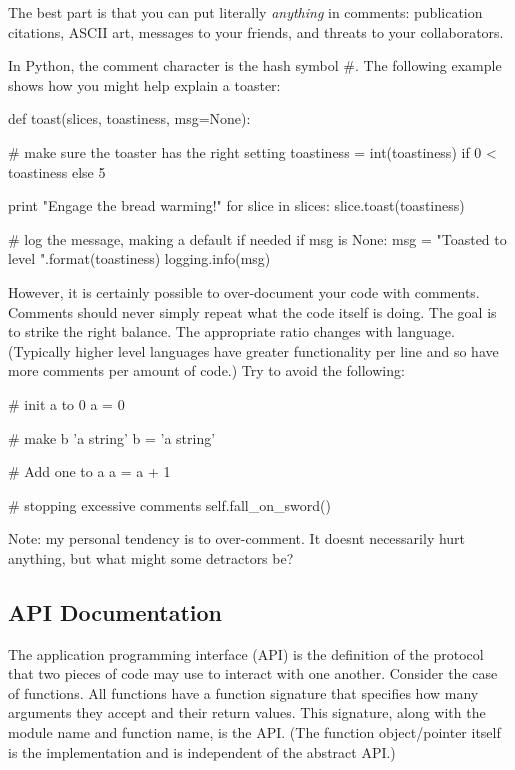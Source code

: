 The best part is that you can put literally {\itshape anything} in comments\+: publication citations, A\+S\+C\+II art, messages to your friends, and threats to your collaborators.

In Python, the comment character is the hash symbol {\ttfamily \#}. The following example shows how you might help explain a toaster\+:

\begin{DoxyVerb}def toast(slices, toastiness, msg=None):

    # make sure the toaster has the right setting
    toastiness = int(toastiness) if 0 < toastiness else 5

    print "Engage the bread warming!"
    for slice in slices:
        slice.toast(toastiness)

    # log the message, making a default if needed
    if msg is None:
        msg = "Toasted to level {}".format(toastiness)
    logging.info(msg)
\end{DoxyVerb}


However, it is certainly possible to over-\/document your code with comments. Comments should never simply repeat what the code itself is doing. The goal is to strike the right balance. The appropriate ratio changes with language. (Typically higher level languages have greater functionality per line and so have more comments per amount of code.) Try to avoid the following\+:

\begin{DoxyVerb}# init a to 0
a = 0

# make b 'a string'
b = 'a string'

# Add one to a
a = a + 1

# stopping excessive comments
self.fall_on_sword()
\end{DoxyVerb}


Note\+: my personal tendency is to over-\/comment. It doesn\textquotesingle{}t necessarily hurt anything, but what might some detractors be?

\subsection*{A\+PI Documentation}

The application programming interface (A\+PI) is the definition of the protocol that two pieces of code may use to interact with one another. Consider the case of functions. All functions have a function signature that specifies how many arguments they accept and their return values. This signature, along with the module name and function name, is the A\+PI. (The function object/pointer itself is the implementation and is independent of the abstract A\+PI.)

